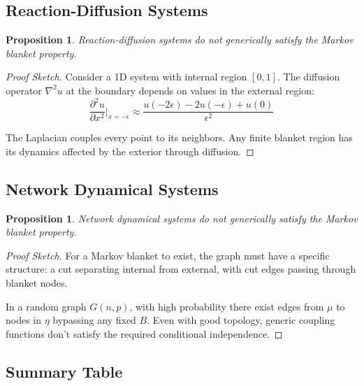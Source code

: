 \documentclass[11pt,a4paper]{article}
\theoremstyle{definition}
\theoremstyle{plain}
\newtheorem{proposition}[definition]{Proposition}
\theoremstyle{remark}
\begin{document}
\subsection{Reaction-Diffusion Systems}

\begin{proposition}\label{prop:reaction-diffusion}
Reaction-diffusion systems do not generically satisfy the Markov blanket property.
\end{proposition}

\begin{proof}[Proof Sketch]
Consider a 1D system with internal region $[0,1]$. The diffusion operator $\nabla^2 u$ at the boundary depends on values in the external region:
\[
\frac{\partial^2 u}{\partial x^2}\bigg|_{x=-\epsilon} \approx \frac{u(-2\epsilon) - 2u(-\epsilon) + u(0)}{\epsilon^2}
\]

The Laplacian couples every point to its neighbors. Any finite blanket region has its dynamics affected by the exterior through diffusion.
\end{proof}

\subsection{Network Dynamical Systems}

\begin{proposition}\label{prop:network}
Network dynamical systems do not generically satisfy the Markov blanket property.
\end{proposition}

\begin{proof}[Proof Sketch]
For a Markov blanket to exist, the graph must have a specific structure: a cut separating internal from external, with cut edges passing through blanket nodes.

In a random graph $G(n, p)$, with high probability there exist edges from $\mu$ to nodes in $\eta$ bypassing any fixed $B$. Even with good topology, generic coupling functions don't satisfy the required conditional independence.
\end{proof}

\subsection{Summary Table}
\end{document}

